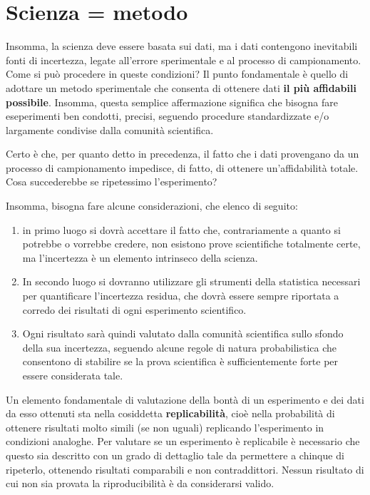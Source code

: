 \documentclass[a4paper,12pt,oneside]{book}
\providecommand{\tightlist}{%
  \setlength{\itemsep}{0pt}\setlength{\parskip}{0pt}}
\theoremstyle{definition}
\theoremstyle{definition}
\theoremstyle{definition}
\theoremstyle{remark}
\begin{document}
\section{Scienza = metodo}\label{scienza-metodo}

Insomma, la scienza deve essere basata sui dati, ma i dati contengono
inevitabili fonti di incertezza, legate all'errore sperimentale e al
processo di campionamento. Come si può procedere in queste condizioni?
Il punto fondamentale è quello di adottare un metodo sperimentale che
consenta di ottenere dati \textbf{il più affidabili possibile}. Insomma,
questa semplice affermazione significa che bisogna fare eseperimenti ben
condotti, precisi, seguendo procedure standardizzate e/o largamente
condivise dalla comunità scientifica.

Certo è che, per quanto detto in precedenza, il fatto che i dati
provengano da un processo di campionamento impedisce, di fatto, di
ottenere un'affidabilità totale. Cosa succederebbe se ripetessimo
l'esperimento?

Insomma, bisogna fare alcune considerazioni, che elenco di seguito:

\begin{enumerate}
\def\labelenumi{\arabic{enumi}.}
\tightlist
\item
  in primo luogo si dovrà accettare il fatto che, contrariamente a
  quanto si potrebbe o vorrebbe credere, non esistono prove scientifiche
  totalmente certe, ma l'incertezza è un elemento intrinseco della
  scienza.
\item
  In secondo luogo si dovranno utilizzare gli strumenti della statistica
  necessari per quantificare l'incertezza residua, che dovrà essere
  sempre riportata a corredo dei risultati di ogni esperimento
  scientifico.
\item
  Ogni risultato sarà quindi valutato dalla comunità scientifica sullo
  sfondo della sua incertezza, seguendo alcune regole di natura
  probabilistica che consentono di stabilire se la prova scientifica è
  sufficientemente forte per essere considerata tale.
\end{enumerate}

Un elemento fondamentale di valutazione della bontà di un esperimento e
dei dati da esso ottenuti sta nella cosiddetta \textbf{replicabilità},
cioè nella probabilità di ottenere risultati molto simili (se non
uguali) replicando l'esperimento in condizioni analoghe. Per valutare se
un esperimento è replicabile è necessario che questo sia descritto con
un grado di dettaglio tale da permettere a chinque di ripeterlo,
ottenendo risultati comparabili e non contraddittori. Nessun risultato
di cui non sia provata la riproducibilità è da considerarsi valido.
\end{document}
